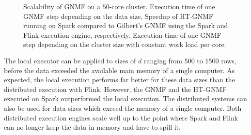 \begin{figure}[!h]
\begin{subfigure}{\dualpgfwidth}
		\caption{}
		\label{fig:gnmfSpeedup}
	\end{subfigure}
	\begin{subfigure}{\dualpgfwidth}
		\caption{}
		\label{fig:nmfNodesRuntime}
	\end{subfigure}
	\caption{Scalability of GNMF on a $50$-core cluster.  Execution time of one GNMF step depending on the data size.  Speedup of HT-GNMF running on Spark compared to Gilbert's GNMF using the Spark and Flink execution engine, respectively.  Execution time of one GNMF step depending on the cluster size with constant work load per core.}
	\label{fig:nmfBenchmark}
\end{figure}

The local executor can be applied to sizes of $d$ ranging from $500$ to $1500$ rows, before the data exceeded the available main memory of a single computer.
As expected, the local execution performs far better for these data sizes than the distributed execution with Flink.
However, the GNMF and the HT-GNMF executed on Spark outperformed the local execution.
The distributed systems can also be used for data sizes which exceed the memory of a single computer.
Both distributed execution engines scale well up to the point where Spark and Flink can no longer keep the data in memory and have to spill it.

